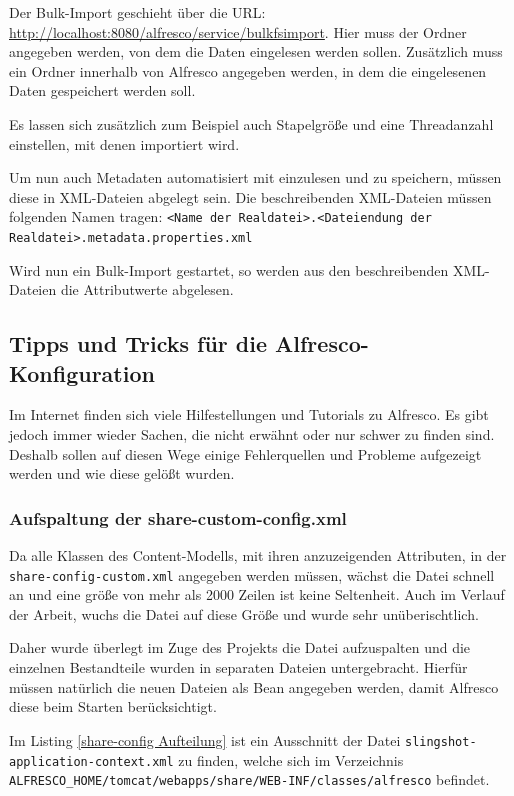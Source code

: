 Der Bulk-Import geschieht \"uber die URL: \url{http://localhost:8080/alfresco/service/bulkfsimport}. Hier muss der Ordner angegeben werden, von dem die Daten eingelesen werden sollen. Zus\"atzlich muss ein Ordner innerhalb von Alfresco angegeben werden, in dem die eingelesenen Daten gespeichert werden soll. 

Es lassen sich zus\"atzlich zum Beispiel auch Stapelgr\"o\ss{}e und eine Threadanzahl einstellen, mit denen importiert wird.

Um nun auch Metadaten automatisiert mit einzulesen und zu speichern, m\"ussen diese in XML-Dateien abgelegt sein. Die beschreibenden XML-Dateien m\"ussen folgenden Namen tragen: \texttt{<Name der Realdatei>.<Dateiendung der Realdatei>.metadata.properties.xml}

Wird nun ein Bulk-Import gestartet, so werden aus den beschreibenden XML-Dateien die Attributwerte abgelesen.
 
\subsection{Tipps und Tricks f\"ur die Alfresco-Konfiguration}
Im Internet finden sich viele Hilfestellungen und Tutorials zu Alfresco. Es gibt jedoch immer wieder Sachen, die nicht erw\"ahnt oder nur schwer zu finden sind. Deshalb sollen auf diesen Wege einige Fehlerquellen und Probleme aufgezeigt werden und wie diese gel\"o\ss{}t wurden.

\subsubsection{Aufspaltung der share-custom-config.xml}
Da alle Klassen des Content-Modells, mit ihren anzuzeigenden Attributen, in der \texttt{share-config-custom.xml} angegeben werden m\"ussen, w\"achst die Datei schnell an und eine gr\"o\ss{}e von mehr als 2000 Zeilen ist keine Seltenheit. Auch im Verlauf der Arbeit, wuchs die Datei auf diese Gr\"o\ss{}e und wurde sehr un\"uberischtlich. 

Daher wurde \"uberlegt im Zuge des Projekts die Datei aufzuspalten und die einzelnen Bestandteile wurden in separaten Dateien untergebracht.
Hierf\"ur m\"ussen nat\"urlich die neuen Dateien als Bean angegeben werden, damit Alfresco diese beim Starten ber\"ucksichtigt.

Im Listing \ref{share-config Aufteilung} ist ein Ausschnitt der Datei \texttt{slingshot-application-context.xml} zu finden, welche sich im Verzeichnis \texttt{ALFRESCO\_HOME/tomcat/webapps/share/WEB-INF/classes/alfresco} befindet.

